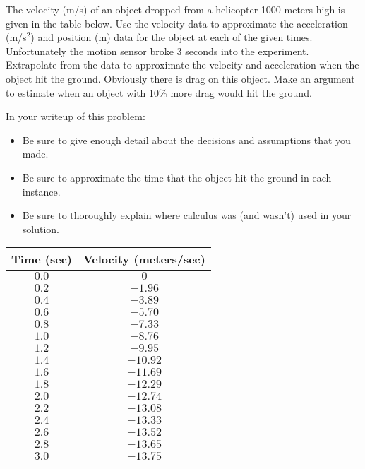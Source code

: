 \begin{lab}
The velocity (m/s) of an object dropped from a helicopter 1000 meters high is given in the
table below.  Use the velocity data to approximate the acceleration (m/s$^2$) and position
(m) data for the object at each of the given times.  Unfortunately the motion sensor broke
3 seconds into the experiment.  Extrapolate from the data to approximate the velocity and
acceleration when the object hit the ground.  Obviously there is drag on this object.
Make an argument to estimate when an object with 10\% more drag would hit the ground.
    
In your writeup of this problem:
    \begin{itemize}
        \item Be sure to give enough detail about the decisions and assumptions that you
            made.  
        \item Be sure to approximate the time that the object hit the ground in each
            instance.
        \item Be sure to thoroughly explain where calculus was (and wasn't) used in your
            solution.
    \end{itemize}

    \begin{center}
        \begin{tabular}{|c|c|}
            \hline
            Time (sec) & Velocity (meters/sec) \\ \hline \hline
            $0.0  $&$0$\\
            $0.2$&$-1.96$\\
            $0.4$&$-3.89$\\
            $0.6$&$-5.70$\\
            $0.8$&$-7.33$\\
            $1.0  $&$-8.76$\\
            $1.2$&$-9.95$\\
            $1.4$&$-10.92$\\
            $1.6$&$-11.69$\\
            $1.8$&$-12.29$\\
            $2.0  $&$-12.74$\\
            $2.2$&$-13.08$\\
            $2.4$&$-13.33$\\
            $2.6$&$-13.52$\\
            $2.8$&$-13.65$\\
            $3.0  $&$-13.75$\\\hline
        \end{tabular}
    \end{center}
\end{lab}


